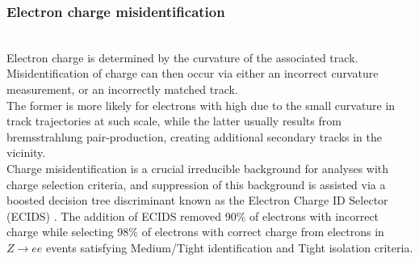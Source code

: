 \documentclass[../thesis.tex]{subfiles}
\begin{document}
\subsubsection*{Electron charge misidentification}
\citep{reco:electron_id}\citep{reco:qmisid_cnn}\\
Electron charge is determined by the curvature of the associated track. Misidentification of charge can then occur via either an incorrect curvature measurement, or an incorrectly matched track.\\
The former is more likely for electrons with high \pT due to the small curvature in track trajectories at such scale, while the latter usually results from bremsstrahlung pair-production, creating additional secondary tracks in the vicinity.\\
Charge misidentification is a crucial irreducible background for analyses with charge selection criteria, and suppression of this background is assisted via a boosted decision tree discriminant known as the Electron Charge ID Selector (ECIDS) \citep{reco:electron_id}. The addition of ECIDS removed 90\% of electrons with incorrect charge while selecting 98\% of electrons with correct charge from electrons in $Z\rightarrow ee$ events satisfying Medium/Tight identification and Tight isolation criteria.
\end{document}

